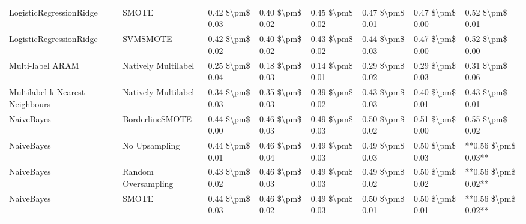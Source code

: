 \begin{tabular}{llllllll}
        LogisticRegressionRidge &                         SMOTE & 0.42 \$\textbackslash pm\$ 0.03 &           0.40 \$\textbackslash pm\$ 0.02 &       0.45 \$\textbackslash pm\$ 0.02 &        0.47 \$\textbackslash pm\$ 0.01 &                         0.47 \$\textbackslash pm\$ 0.00 &     0.52 \$\textbackslash pm\$ 0.01 \\
        LogisticRegressionRidge &                      SVMSMOTE & 0.42 \$\textbackslash pm\$ 0.02 &           0.40 \$\textbackslash pm\$ 0.02 &       0.43 \$\textbackslash pm\$ 0.02 &        0.44 \$\textbackslash pm\$ 0.03 &                         0.47 \$\textbackslash pm\$ 0.00 &     0.52 \$\textbackslash pm\$ 0.00 \\
               Multi-label ARAM &           Natively Multilabel & 0.25 \$\textbackslash pm\$ 0.04 &           0.18 \$\textbackslash pm\$ 0.03 &       0.14 \$\textbackslash pm\$ 0.01 &        0.29 \$\textbackslash pm\$ 0.02 &                         0.29 \$\textbackslash pm\$ 0.03 &     0.31 \$\textbackslash pm\$ 0.06 \\
Multilabel k Nearest Neighbours &           Natively Multilabel & 0.34 \$\textbackslash pm\$ 0.03 &           0.35 \$\textbackslash pm\$ 0.03 &       0.39 \$\textbackslash pm\$ 0.02 &        0.43 \$\textbackslash pm\$ 0.03 &                         0.40 \$\textbackslash pm\$ 0.01 &     0.43 \$\textbackslash pm\$ 0.01 \\
                     NaiveBayes &               BorderlineSMOTE & 0.44 \$\textbackslash pm\$ 0.00 &           0.46 \$\textbackslash pm\$ 0.03 &       0.49 \$\textbackslash pm\$ 0.03 &        0.50 \$\textbackslash pm\$ 0.02 &                         0.51 \$\textbackslash pm\$ 0.00 &     0.55 \$\textbackslash pm\$ 0.02 \\
                     NaiveBayes &                 No Upsampling & 0.44 \$\textbackslash pm\$ 0.01 &           0.46 \$\textbackslash pm\$ 0.04 &       0.49 \$\textbackslash pm\$ 0.03 &        0.49 \$\textbackslash pm\$ 0.03 &                         0.50 \$\textbackslash pm\$ 0.03 & **0.56 \$\textbackslash pm\$ 0.03** \\
                     NaiveBayes &           Random Oversampling & 0.43 \$\textbackslash pm\$ 0.02 &           0.46 \$\textbackslash pm\$ 0.03 &       0.49 \$\textbackslash pm\$ 0.03 &        0.49 \$\textbackslash pm\$ 0.02 &                         0.50 \$\textbackslash pm\$ 0.02 & **0.56 \$\textbackslash pm\$ 0.02** \\
                     NaiveBayes &                         SMOTE & 0.44 \$\textbackslash pm\$ 0.03 &           0.46 \$\textbackslash pm\$ 0.02 &       0.49 \$\textbackslash pm\$ 0.03 &        0.50 \$\textbackslash pm\$ 0.01 &                         0.50 \$\textbackslash pm\$ 0.01 & **0.56 \$\textbackslash pm\$ 0.02** \\

\end{tabular}
